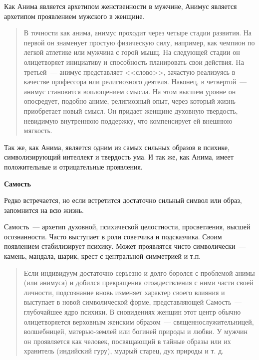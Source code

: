 \documentclass[a5paper,12pt,twoside]{memoir}
\begin{document}
Как Анима является архетипом женственности в мужчине, Анимус является архетипом проявлением мужского в женщине.

\begin{quotation}
В точности как анима, анимус проходит через четыре стадии развития. На первой он знаменует простую физическую силу, например, как чемпион по легкой атлетике или мужчина с горой мышц. На следующей стадии он олицетворяет инициативу и способность планировать свои действия. На третьей~--- анимус представляет <<слово>>, зачастую реализуясь в качестве профессора или религиозного деятеля. Наконец, в четвертой~--- анимус становится воплощением смысла. На этом высшем уровне он опосредует, подобно аниме, религиозный опыт, через который жизнь приобретает новый смысл. Он придает женщине духовную твердость, невидимую внутреннюю поддержку, что компенсирует ей внешнюю мягкость. 
\end{quotation}

Так же, как Анима, является одним из самых сильных образов в психике, символизирующий интеллект и твердость ума. И так же, как Анима, имеет положительные и отрицательные проявления.


\begin{center}
\bfseries{Самость}
\end{center} 

Редко встречается, но если встретится достаточно сильный символ или образ, запомнится на всю жизнь.

Самость~--- архетип духовной, психической целостности, просветления, высшей осознанности. Часто выступает в роли советчика и подсказчика. Своим появлением стабилизирует психику. Может проявлятся чисто символически~--- камень, мандала, шарик, крест с центральной симметрией и т.п.

\begin{quotation}
Если индивидуум достаточно серьезно и долго боролся с проблемой анимы (или анимуса) и добился прекращения отождествления с ними части своей личности, подсознание вновь изменяет характер своего влияния и выступает в новой символической форме, представляющей Самость~--- глубочайшее ядро психики. В сновидениях женщин этот центр обычно олицетворяется верховным женским образом~--- священнослужительницей, волшебницей, ма\-терь\-ю-землей или богиней природы и любви. У мужчин он проявляется как человек, посвящающий в тайные образы или их хранитель (индийский гуру), мудрый старец, дух природы и т. д. 
\end{quotation}
\end{document}
